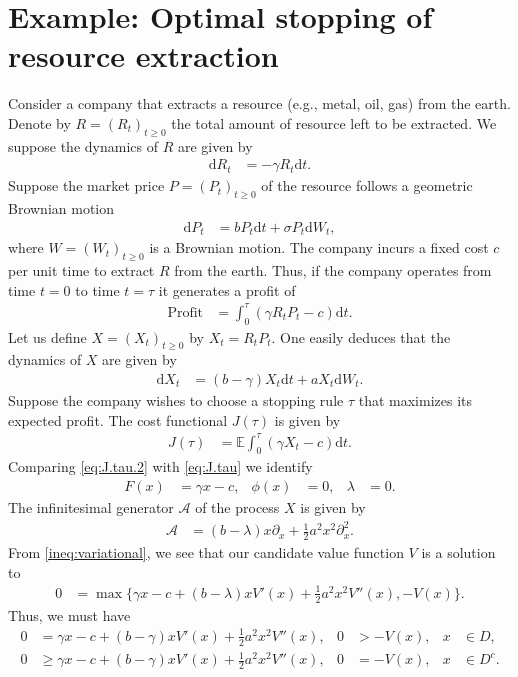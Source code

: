 \documentclass[12pt]{book}
\let\varphi\phi
\numberwithin{equation}{chapter}
\theoremstyle{plain}
\numberwithin{theorem}{section}
\theoremstyle{definition}
\numberwithin{exercise}{chapter}
\newcommand{\<}{\langle}
\renewcommand{\>}{\rangle}
\renewcommand{\(}{\left(}
\renewcommand{\)}{\right)}
\renewcommand{\[}{\left[}
\renewcommand{\]}{\right]}
\newcommand\Eb{\mathds{E}}
\newcommand\Ac{\mathscr{A}}
\newcommand\sig{\sigma}
\newcommand\gam{\gamma}
\newcommand\lam{\lambda}
\renewcommand\d{\partial}
\newcommand\dd{\mathrm{d}}
\begin{document}
\section{Example: Optimal stopping of resource extraction}
Consider a company that extracts a resource (e.g., metal, oil, gas) from the earth.  Denote by $R = (R_t)_{t \geq 0}$ the total amount of resource left to be extracted.  We suppose the dynamics of $R$ are given by
\begin{align}
\dd R_t
	&=	- \gam R_t \dd t .
\end{align}
Suppose the market price $P = (P_t)_{t \geq 0}$ of the resource follows a geometric Brownian motion
\begin{align}
\dd P_t
	&=	b P_t \dd t + \sig P_t \dd W_t ,
\end{align}
where $W = (W_t)_{t \geq 0}$ is a Brownian motion.  The company incurs a fixed cost $c$ per unit time to extract $R$ from the earth.  Thus, if the company operates from time $t=0$ to time $t = \tau$ it generates a profit of
\begin{align}
\text{Profit}
	&=	\int_0^\tau ( \gam R_t P_t - c ) \dd t .
\end{align}
Let us define $X = (X_t)_{t \geq 0}$ by $X_t = R_t P_t$.  One easily deduces that the dynamics of $X$ are given by
\begin{align}
\dd X_t
	&=	(b - \gam) X_t \dd t + a X_t \dd W_t .
\end{align}
Suppose the company wishes to choose a stopping rule $\tau$ that maximizes its expected profit.  The cost functional $J(\tau)$ is given by
\begin{align}
J(\tau)
	&=	\Eb \int_0^\tau ( \gam X_t - c ) \dd t . \label{eq:J.tau.2}
\end{align}
Comparing \eqref{eq:J.tau.2} with \eqref{eq:J.tau} we identify
\begin{align}
F(x)
	&=	\gam x - c , &
\varphi(x)
	&=	0 , &
\lam
	&=	0 .
\end{align}
The infinitesimal generator $\Ac$ of the process $X$ is given by
\begin{align}
\Ac
	&=	(b - \lam) x \d_x + \tfrac{1}{2} a^2 x^2 \d_x^2 .
\end{align}
From \eqref{ineq:variational}, we see that our candidate value function $V$ is a solution to
\begin{align}
0
	&=	\max \{ \gam x - c + (b - \lam) x V'(x) + \tfrac{1}{2} a^2 x^2 V''(x)  , - V(x) \} .
\end{align}
Thus, we must have
\begin{align}
0
	&=	\gam x - c + (b - \gam) x V'(x) + \tfrac{1}{2} a^2 x^2 V''(x) , &
0
	&> - V(x) , &
x
	&\in D , \label{eq:on.D}\\
0
	&\geq	\gam x - c + (b - \gam) x V'(x) + \tfrac{1}{2} a^2 x^2 V''(x) , &
0
	&= - V(x) , &
x
	&\in D^c . \label{eq:on.Dc}
\end{align}
\end{document}

